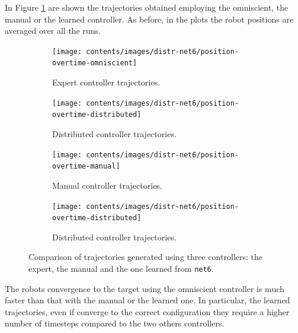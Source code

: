In Figure \ref{fig:net6traj} are shown the trajectories obtained employing the 
omniscient, the manual or the learned controller. As before, in the plots the robot 
positions are averaged over all the runs. 

\begin{figure}[!htb]
	\centering
	\begin{subfigure}[h]{0.49\textwidth}
		\centering
		\texttt{[image: contents/images/distr-net6/position-overtime-omniscient]}%
		\caption{Expert controller trajectories.}
	\end{subfigure}
	\hfill
	\begin{subfigure}[h]{0.49\textwidth}
		\centering
		\texttt{[image: contents/images/distr-net6/position-overtime-distributed]}
		\caption{Distributed controller trajectories.}
	\end{subfigure}
	\hspace*{\fill}%
	
	\vspace*{8pt}%
	
	\hspace*{\fill}%
	\begin{subfigure}[h]{0.49\textwidth}
		\centering
		\texttt{[image: contents/images/distr-net6/position-overtime-manual]}%
		\caption{Manual controller trajectories.}
	\end{subfigure}
	\hfill
	\begin{subfigure}[h]{0.49\textwidth}
		\centering
		\texttt{[image: contents/images/distr-net6/position-overtime-distributed]}
		\caption{Distributed controller trajectories.}
	\end{subfigure}
	\caption[Evaluation of the trajectories learned by \texttt{net6}.]{Comparison 
		of trajectories generated using three controllers: the expert, the manual and 
		the one learned from \texttt{net6}.}
	\label{fig:net6traj}
\end{figure}

The robots convergence to the target using the omniscient controller is much 
faster than that with the manual or the learned one. In particular, the learned 
trajectories, even if converge to the correct configuration they require a higher 
number of timesteps compared to the two others controllers.

